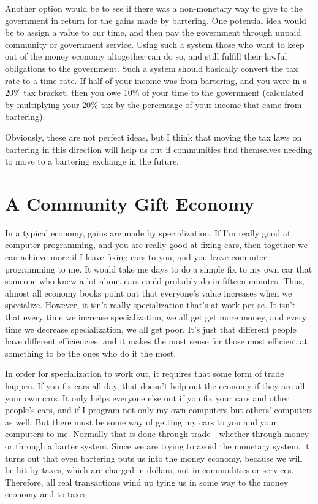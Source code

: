 \begin{policynote}
Another option would be to see if there was a non-monetary way to give to the government in return
for the gains made by bartering.  One potential idea would be to assign a value to our time, and 
then pay the government through unpaid community or government service.  Using such a system those
who want to keep out of the money economy altogether can do so, and still fulfill their lawful
obligations to the government.  Such a system should basically convert the tax rate to a time rate. 
If half of your income was from bartering, and you were in a 20\% tax bracket, then you owe 10\%
of your time to the government (calculated by multiplying your 20\% tax by the percentage of your income that came from bartering).

Obviously, these are not perfect ideas, but I think that moving the tax laws on bartering in this
direction will help us out if communities find themselves needing to move to a bartering exchange in the future.
\end{policynote}

\section{A Community Gift Economy}

In a typical economy, gains are made by specialization. If I’m really
good at computer programming, and you are really good at fixing cars,
then together we can achieve more if I leave fixing cars to you, and
you leave computer programming to me. It would take me days to do a
simple fix to my own car that someone who knew a lot about cars could
probably do in fifteen minutes. Thus, almost all economy books point
out that everyone’s value increases when we specialize. However, it
isn’t really specialization that’s at work per se. 
It isn’t that every time we
increase specialization,
we all get
get more money, and
every time we decrease specialization, we all get poor. It’s just that
different people have different efficiencies, and it makes the most
sense for those most efficient at something to be the ones who do it
the most.

In order for specialization to work out, it requires that some form of
trade happen. If you fix cars all day, that doesn’t help out the
economy if they are all your own cars. It only helps everyone else out
if you fix your cars and other people’s cars, and if I program not only
my own computers but others’ computers as well. But there must be some
way of getting my cars to you and your computers to me. Normally that
is done through trade---whether through money or through a barter system.
Since we are trying to avoid the monetary system, it turns out that
even bartering puts us into the money economy, because we will be hit
by taxes, which are charged in dollars, not in commodities or services.
Therefore, all real transactions wind up tying us in some way to the
money economy and to taxes.

